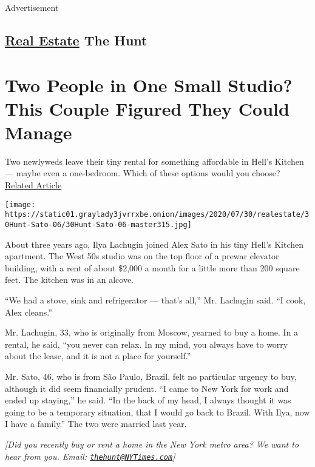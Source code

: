 Advertisement

\hypertarget{-real-estate--the-hunt}{%
\subsection{\texorpdfstring{
\href{https://www.nytimes3xbfgragh.onion/section/realestate}{Real
Estate} \textbar{}The
Hunt}{ Real Estate  \textbar{}The Hunt}}\label{-real-estate--the-hunt}}

\hypertarget{two-people-in-one-small-studio-this-couple-figured-they-could-manage}{%
\section{Two People in One Small Studio? This Couple Figured They Could
Manage}\label{two-people-in-one-small-studio-this-couple-figured-they-could-manage}}

Two newlyweds leave their tiny rental for something affordable in Hell's
Kitchen --- maybe even a one-bedroom. Which of these options would you
choose?
\href{https://www.nytimes3xbfgragh.onion/interactive/2020/07/23/realestate/23hunt-hirt.html}{Related
Article}

\texttt{[image: https://static01.graylady3jvrrxbe.onion/images/2020/07/30/realestate/30Hunt-Sato-06/30Hunt-Sato-06-master315.jpg]}

About three years ago, Ilya Lachugin joined Alex Sato in his tiny Hell's
Kitchen apartment. The West 50s studio was on the top floor of a prewar
elevator building, with a rent of about \$2,000 a month for a little
more than 200 square feet. The kitchen was in an alcove.

``We had a stove, sink and refrigerator --- that's all,'' Mr. Lachugin
said. ``I cook, Alex cleans.''

Mr. Lachugin, 33, who is originally from Moscow, yearned to buy a home.
In a rental, he said, ``you never can relax. In my mind, you always have
to worry about the lease, and it is not a place for yourself.''

Mr. Sato, 46, who is from São Paulo, Brazil, felt no particular urgency
to buy, although it did seem financially prudent. ``I came to New York
for work and ended up staying,'' he said. ``In the back of my head, I
always thought it was going to be a temporary situation, that I would go
back to Brazil. With Ilya, now I have a family.'' The two were married
last year.

\emph{{[}Did you recently buy or rent a home in the New York metro area?
We want to hear from you. Email:
\href{mailto:thehunt@NYTimes.com}{\nolinkurl{thehunt@NYTimes.com}}{]}}


